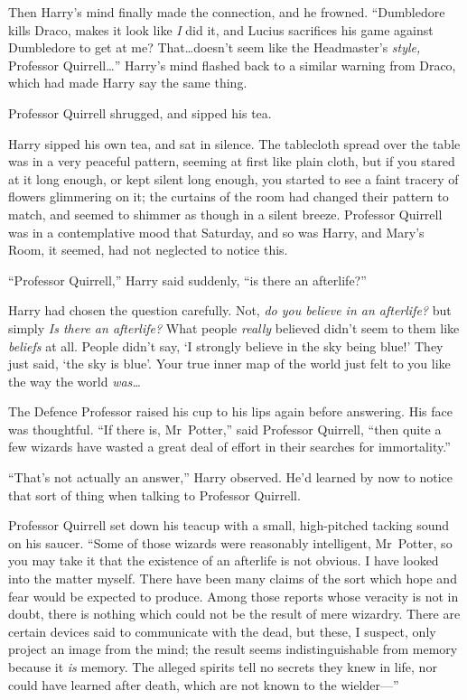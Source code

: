 Then Harry’s mind finally made the connection, and he frowned. “Dumbledore kills Draco, makes it look like \emph{I} did it, and Lucius sacrifices his game against Dumbledore to get at me? That…doesn’t seem like the Headmaster’s \emph{style,} Professor Quirrell…” Harry’s mind flashed back to a similar warning from Draco, which had made Harry say the same thing.

Professor Quirrell shrugged, and sipped his tea.

Harry sipped his own tea, and sat in silence. The tablecloth spread over the table was in a very peaceful pattern, seeming at first like plain cloth, but if you stared at it long enough, or kept silent long enough, you started to see a faint tracery of flowers glimmering on it; the curtains of the room had changed their pattern to match, and seemed to shimmer as though in a silent breeze. Professor Quirrell was in a contemplative mood that Saturday, and so was Harry, and Mary’s Room, it seemed, had not neglected to notice this.

“Professor Quirrell,” Harry said suddenly, “is there an afterlife?”

Harry had chosen the question carefully. Not, \emph{do you believe in an afterlife?} but simply \emph{Is there an afterlife?} What people \emph{really} believed didn’t seem to them like \emph{beliefs} at all. People didn’t say, ‘I strongly believe in the sky being blue!’ They just said, ‘the sky is blue’. Your true inner map of the world just felt to you like the way the world \emph{was…}

The Defence Professor raised his cup to his lips again before answering. His face was thoughtful. “If there is, Mr~Potter,” said Professor Quirrell, “then quite a few wizards have wasted a great deal of effort in their searches for immortality.”

“That’s not actually an answer,” Harry observed. He’d learned by now to notice that sort of thing when talking to Professor Quirrell.

Professor Quirrell set down his teacup with a small, high-pitched tacking sound on his saucer. “Some of those wizards were reasonably intelligent, Mr~Potter, so you may take it that the existence of an afterlife is not obvious. I have looked into the matter myself. There have been many claims of the sort which hope and fear would be expected to produce. Among those reports whose veracity is not in doubt, there is nothing which could not be the result of mere wizardry. There are certain devices said to communicate with the dead, but these, I suspect, only project an image from the mind; the result seems indistinguishable from memory because it \emph{is} memory. The alleged spirits tell no secrets they knew in life, nor could have learned after death, which are not known to the wielder—”

